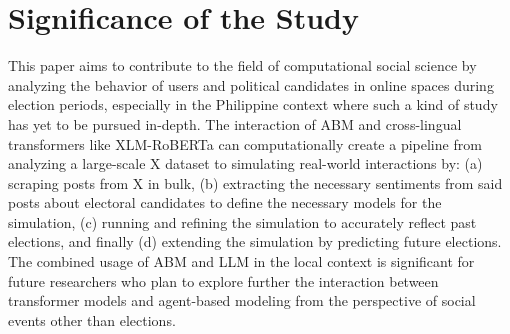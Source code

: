 \section{Significance of the Study}
This paper aims to contribute to the field of computational social science by analyzing the behavior of users and political candidates in online spaces during election periods, especially in the Philippine context where such a kind of study has yet to be pursued in-depth. The interaction of ABM and cross-lingual transformers like XLM-RoBERTa can computationally create a pipeline from analyzing a large-scale X dataset to simulating real-world interactions by: (a) scraping posts from X in bulk, (b) extracting the necessary sentiments from said posts about electoral candidates to define the necessary models for the simulation, (c) running and refining the simulation to accurately reflect past elections, and finally (d) extending the simulation by predicting future elections. The combined usage of ABM and LLM in the local context is significant for future researchers who plan to explore further the interaction between transformer models and agent-based modeling from the perspective of social events other than elections.